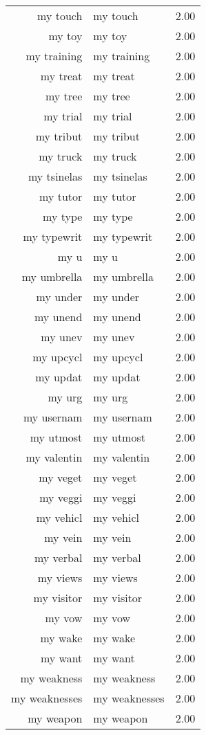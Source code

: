 \begin{table}[ht]
\begin{tabular}{rlr}
  my touch & my touch & 2.00 \\ 
  my toy & my toy & 2.00 \\ 
  my training & my training & 2.00 \\ 
  my treat & my treat & 2.00 \\ 
  my tree & my tree & 2.00 \\ 
  my trial & my trial & 2.00 \\ 
  my tribut & my tribut & 2.00 \\ 
  my truck & my truck & 2.00 \\ 
  my tsinelas & my tsinelas & 2.00 \\ 
  my tutor & my tutor & 2.00 \\ 
  my type & my type & 2.00 \\ 
  my typewrit & my typewrit & 2.00 \\ 
  my u & my u & 2.00 \\ 
  my umbrella & my umbrella & 2.00 \\ 
  my under & my under & 2.00 \\ 
  my unend & my unend & 2.00 \\ 
  my unev & my unev & 2.00 \\ 
  my upcycl & my upcycl & 2.00 \\ 
  my updat & my updat & 2.00 \\ 
  my urg & my urg & 2.00 \\ 
  my usernam & my usernam & 2.00 \\ 
  my utmost & my utmost & 2.00 \\ 
  my valentin & my valentin & 2.00 \\ 
  my veget & my veget & 2.00 \\ 
  my veggi & my veggi & 2.00 \\ 
  my vehicl & my vehicl & 2.00 \\ 
  my vein & my vein & 2.00 \\ 
  my verbal & my verbal & 2.00 \\ 
  my views & my views & 2.00 \\ 
  my visitor & my visitor & 2.00 \\ 
  my vow & my vow & 2.00 \\ 
  my wake & my wake & 2.00 \\ 
  my want & my want & 2.00 \\ 
  my weakness & my weakness & 2.00 \\ 
  my weaknesses & my weaknesses & 2.00 \\ 
  my weapon & my weapon & 2.00 \\ 

\end{tabular}
\end{table}
